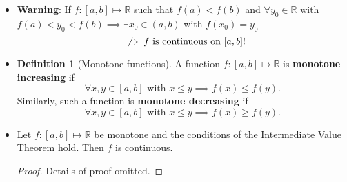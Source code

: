\documentclass{article}
\newcommand{\R}{\mathbb{R}}
\newcommand{\?}{\stackrel{?}{=}}
\theoremstyle{definition} %
\newtheorem{definition}[subsection]{Definition} %
\begin{document}
\begin{itemize}
\begin{proof}
\begin{enumerate}[label=(\roman*)]
\begin{align*}
                y_0 \geq \lim_{n \to \infty} f(z_n) = f\left(\lim_{n \to \infty} f(z_n)\right) = f(s) \implies f(s) \leq y_0.
            \end{align*}
        \end{enumerate}
        Together, (i) and (ii) imply that $f(s) = y_0$.
    \end{proof}
    \item \warning \textbf{Warning}: If $f: [a, b] \mapsto \R$ such that $f(a) < f(b)$ and $\forall y_0 \in \R$ with $f(a) < y_0 < f(b) \implies \exists x_0 \in (a, b)$ with $f(x_0) = y_0$
    $$\centernot\implies f \text{ is continuous on } [a, b]!$$
    \item[]
    \begin{definition}[Monotone functions]
        A function $f: [a, b] \mapsto \R$ is \textbf{monotone increasing} if
        $$\forall x, y \in [a, b] \text{ with } x \leq y \implies f(x) \leq f(y).$$
        Similarly, such a function is \textbf{monotone decreasing} if
        $$\forall x, y \in [a, b] \text{ with } x \leq y \implies f(x) \geq f(y).$$
    \end{definition}
    \item[]
    \begin{lemma}
        Let $f: [a, b] \mapsto \R$ be monotone and the conditions of the Intermediate Value Theorem hold. Then $f$ is continuous.
    \end{lemma}
    \begin{proof}
        Details of proof omitted. 
    \end{proof}
\end{itemize}

\newpage

\listoftheorems[]
 
\end{document}

